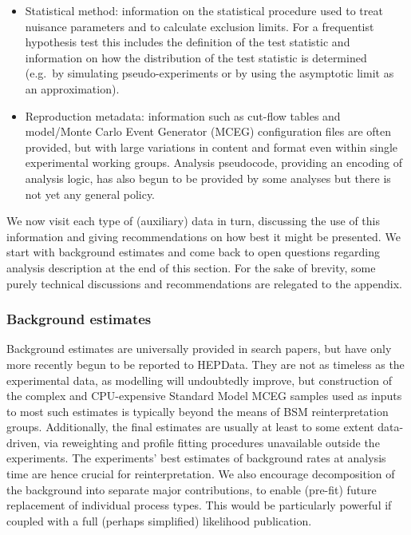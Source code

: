 \documentclass[a4paper,aps,prd,longbibliography,notitlepage,showpacs,amsmath,amssymb,superscriptaddress,nofootinbib,floatfix,11pt,preprintnumbers]{revtex4-1-mod}
\newcommand{\hepdata}{\textsf{HEPData}\xspace}
\newcommand{\eg}{e.g.\xspace}
\begin{document}
\begin{itemize}
    \item Statistical method: information on the statistical procedure used to treat nuisance parameters and to calculate exclusion limits. For a frequentist hypothesis test this includes the definition of the test statistic and information on how the distribution of the test statistic is determined (\eg\ by simulating pseudo-experiments or by using the asymptotic limit as an approximation).
    \item Reproduction metadata: information such as cut-flow tables and model/Monte Carlo Event Generator (MCEG) configuration files are often provided, but with large variations in content and format even within single experimental working groups. Analysis pseudocode, providing an encoding of analysis logic, has also begun to be provided by some analyses but there is not yet any general policy.
\end{itemize}

We now visit each type of (auxiliary) data in turn, discussing the use of this information and giving recommendations on how best it might be presented. We start with background estimates and come back to open questions regarding analysis description at the end of this section.
For the sake of brevity, some purely technical discussions and recommendations are relegated to the appendix.



\subsubsection{Background estimates}

Background estimates are universally provided in search papers, but have only more recently begun to be reported to \hepdata. They are not as timeless as the experimental data, as modelling will undoubtedly improve, but construction of the complex and CPU-expensive Standard Model MCEG samples used as inputs to most such estimates is typically beyond the means of BSM reinterpretation groups. Additionally, the final estimates are usually at least to some extent data-driven, via reweighting and profile fitting procedures unavailable outside the experiments. The experiments' best estimates of background rates at analysis time are hence crucial for reinterpretation. We also encourage decomposition of the background into separate major contributions, to enable (pre-fit) future replacement of individual process types. This would be particularly powerful if coupled with a full (perhaps simplified) likelihood publication.
\end{document}
